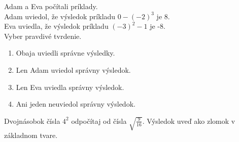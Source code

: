\begin{example}
	Adam a Eva počítali príklady.  \\
	Adam uviedol, že výsledok príkladu $0 - (-2)^3$ je 8. \\
	Eva uviedla, že výsledok príkladu $(-3)^2 - 1$ je -8. \\
	Vyber pravdivé tvrdenie.
	\begin{enumerate}
		\item Obaja uviedli správne výsledky.
		\item Len Adam uviedol správny výsledok.
		\item Len Eva uviedla správny výsledok.
		\item Ani jeden neuviedol správny výsledok.
	\end{enumerate}
\end{example}

\begin{example}
	Dvojnásobok čísla $4^2$ odpočítaj od čísla $\sqrt{\frac{9}{16}}$. Výsledok uveď ako zlomok v základnom tvare.
\end{example}